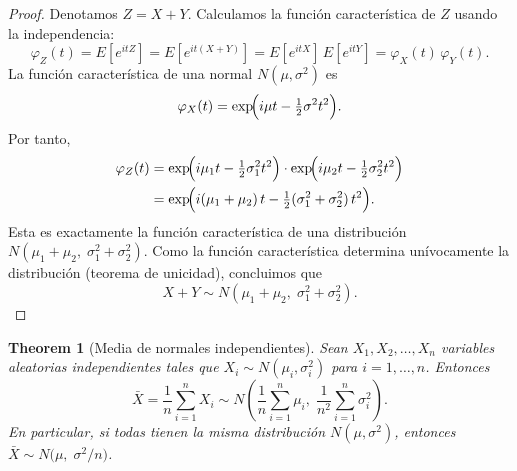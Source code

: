 \documentclass[11pt,a4paper]{article}
\theoremstyle{plain}
\newtheorem{theorem}{Theorem}[section]
\theoremstyle{definition}
\theoremstyle{remark}
\begin{document}
\begin{proof}
Denotamos $Z = X + Y$. Calculamos la función característica de $Z$ usando la independencia:
\[
\varphi_Z(t) = E[e^{itZ}] = E[e^{it(X+Y)}] = E[e^{itX}]\,E[e^{itY}] = \varphi_X(t)\,\varphi_Y(t).
\]
La función característica de una normal $N(\mu, \sigma^2)$ es
\[
\varphi_X(t) = \exp\!\Bigl(i\mu t - \tfrac{1}{2}\sigma^2 t^2\Bigr).
\]
Por tanto,
\begin{align*}
\varphi_Z(t) &= \exp\!\Bigl(i\mu_1 t - \tfrac{1}{2}\sigma_1^2 t^2\Bigr) \cdot \exp\!\Bigl(i\mu_2 t - \tfrac{1}{2}\sigma_2^2 t^2\Bigr) \\
&= \exp\!\Bigl(i(\mu_1 + \mu_2)\,t - \tfrac{1}{2}(\sigma_1^2 + \sigma_2^2)\,t^2\Bigr).
\end{align*}
Esta es exactamente la función característica de una distribución $N(\mu_1 + \mu_2,\; \sigma_1^2 + \sigma_2^2)$. Como la función característica determina unívocamente la distribución (teorema de unicidad), concluimos que
\[
X + Y \sim N(\mu_1 + \mu_2,\; \sigma_1^2 + \sigma_2^2).
\]
\end{proof}


\begin{theorem}[Media de normales independientes]
Sean $X_1, X_2, \ldots, X_n$ variables aleatorias independientes tales que $X_i \sim N(\mu_i, \sigma_i^2)$ para $i = 1, \ldots, n$. Entonces
\[
\bar{X} = \frac{1}{n}\sum_{i=1}^n X_i \sim N\!\left(\frac{1}{n}\sum_{i=1}^n \mu_i,\; \frac{1}{n^2}\sum_{i=1}^n \sigma_i^2\right).
\]
En particular, si todas tienen la misma distribución $N(\mu, \sigma^2)$, entonces $\bar{X} \sim N\bigl(\mu,\; \sigma^2/n\bigr)$.
\end{theorem}
\end{document}
